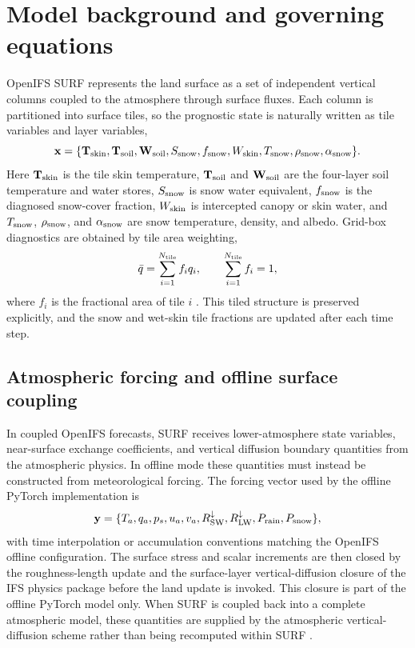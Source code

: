 \section{Model background and governing equations}
\label{sec:model-background}

OpenIFS SURF represents the land surface as a set of independent vertical
columns coupled to the atmosphere through surface fluxes.  Each column is
partitioned into surface tiles, so the prognostic state is naturally written as
tile variables and layer variables,
\begin{equation}
  \mathbf{x} = \{\mathbf{T}_{\rm skin}, \mathbf{T}_{\rm soil},
  \mathbf{W}_{\rm soil}, S_{\rm snow}, f_{\rm snow}, W_{\rm skin},
  T_{\rm snow}, \rho_{\rm snow}, \alpha_{\rm snow}\}.
\label{eq:model-state}
\end{equation}
Here $\mathbf{T}_{\rm skin}$ is the tile skin temperature, $\mathbf{T}_{\rm
soil}$ and $\mathbf{W}_{\rm soil}$ are the four-layer soil temperature and
water stores, $S_{\rm snow}$ is snow water equivalent, $f_{\rm snow}$ is the
diagnosed snow-cover fraction, $W_{\rm skin}$ is intercepted canopy or skin
water, and $T_{\rm snow}$, $\rho_{\rm snow}$, and $\alpha_{\rm snow}$ are snow
temperature, density, and albedo.  Grid-box diagnostics are obtained by tile
area weighting,
\begin{equation}
  \bar{q} = \sum_{i=1}^{N_{\rm tile}} f_i q_i, \qquad
  \sum_{i=1}^{N_{\rm tile}} f_i = 1,
\label{eq:model-tilemean}
\end{equation}
where $f_i$ is the fractional area of tile $i$
\citep{ViterboBeljaars1995,Balsamo2009,Boussetta2021ECLand}.  This tiled structure is
preserved explicitly, and the snow and wet-skin tile fractions are updated
after each time step.

\subsection{Atmospheric forcing and offline surface coupling}

In coupled OpenIFS forecasts, SURF receives lower-atmosphere state variables,
near-surface exchange coefficients, and vertical diffusion boundary quantities
from the atmospheric physics.  In offline mode these quantities must
instead be constructed from meteorological forcing.  The forcing vector used by the
offline PyTorch implementation is
\begin{equation}
  \mathbf{y} = \{T_a, q_a, p_s, u_a, v_a, R_{\rm SW}^{\downarrow},
  R_{\rm LW}^{\downarrow}, P_{\rm rain}, P_{\rm snow}\},
\label{eq:model-forcing}
\end{equation}
with time interpolation or accumulation conventions matching the OpenIFS
offline configuration.  The surface stress and scalar increments are then closed by
the roughness-length update and the surface-layer vertical-diffusion
closure of the IFS physics package before the land update is invoked.
This closure is part of the offline PyTorch model only.
When SURF is coupled back into a complete atmospheric model, these quantities
are supplied by the atmospheric vertical-diffusion scheme rather than being
recomputed within SURF \citep{ECMWFIFSPartIV}.

